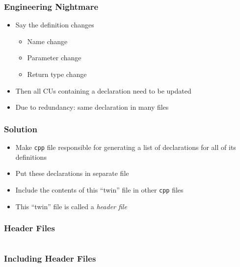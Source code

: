 \begin{frame}
  \frametitle{Engineering Nightmare}
  \begin{itemize}
    \item Say the definition changes
          \begin{itemize}
            \item Name change
            \item Parameter change
            \item Return type change
          \end{itemize}
    \item Then all CUs containing a declaration need to be updated
    \item Due to redundancy: same declaration in many files
  \end{itemize}
\end{frame}

\begin{frame}
  \frametitle{Solution}
  \begin{itemize}
    \item Make {\tt cpp} file responsible for generating a list of declarations
          for all of its definitions
    \item Put these declarations in separate file
    \item Include the contents of this ``twin'' file in other {\tt cpp} files
    \item This ``twin'' file is called a \emph{header file}
  \end{itemize}
\end{frame}

\begin{frame}
  \frametitle{Header Files}
  \begin{columns}[t]
    \column{5cm}
    \column{5cm}
  \end{columns}
\end{frame}

\begin{frame}
  \frametitle{Including Header Files}
\end{frame}

